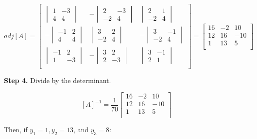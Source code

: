 \documentclass[
]{book}
\begin{document}
\[
  adj\left[A\right] =
\begin{bmatrix}
\begin{vmatrix} 1 & -3 \\ 4 & 4 \end{vmatrix} 
& - \begin{vmatrix} 2 & -3 \\ -2 & 4 \end{vmatrix}  
& \begin{vmatrix} 2 & 1 \\ -2 & 4 \end{vmatrix} \\
- \begin{vmatrix} -1 & 2 \\ 4 & 4 \end{vmatrix} 
& \begin{vmatrix} 3 & 2 \\ -2 & 4 \end{vmatrix}  
& - \begin{vmatrix} 3 & -1 \\ -2 & 4\end{vmatrix} \\
\begin{vmatrix} -1 & 2 \\ 1 & -3 \end{vmatrix} 
& - \begin{vmatrix} 3 & 2 \\ 2 & -3 \end{vmatrix}  
& \begin{vmatrix} 3 & -1 \\ 2 & 1\end{vmatrix} \\
\end{bmatrix}
=
\begin{bmatrix}
16 & -2 & 10 \\
12 & 16 & -10 \\
1 & 13 & 5 \\
\end{bmatrix}
\]

\textbf{Step 4.} Divide by the determinant.

\[
\left[ A \right]^{-1} = \frac{1}{70}
\begin{bmatrix}
16 & -2 & 10 \\
12 & 16 & -10 \\
1 & 13 & 5 \\
\end{bmatrix}
\]

Then, if \(y_1 = 1, y_2 = 13\), and \(y_3 = 8\):
\end{document}
